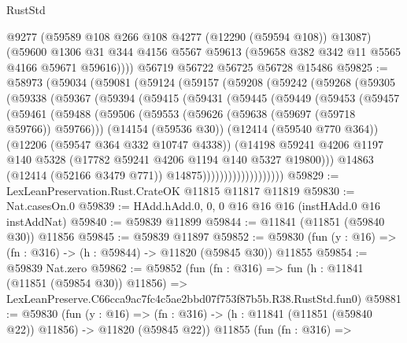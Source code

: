 \begin{lexlean}{RustStd}
\begin{coremodule}
        @9277
        (@59589 @108 @266 @108 @4277 (@12290 (@59594 @108)) @13087)
        (@59600
          @1306
          @31
          @344
          @4156
          @5567
          @59613
          (@59658 @382 @342 @11 @5565 @4166 @59671 @59616))))
    @56719
    @56722
    @56725
    @56728
    @15486
@59825 := @58973
    (@59034
      (@59081
        (@59124
          (@59157
            (@59208
              (@59242
                (@59268
                  (@59305
                    (@59338
                      (@59367
                        (@59394
                          (@59415
                            (@59431
                              (@59445
                                (@59449
                                  (@59453
                                    (@59457
                                      (@59461
                                        (@59488
                                          (@59506
                                            (@59553
                                              (@59626 (@59638 (@59697 (@59718 @59766)) @59766)))
                                            (@14154 (@59536 @30))
                                            (@12414 (@59540 @770 @364))
                                            (@12206 (@59547 @364 @332 @10747 @4338))
                                            (@14198
                                              @59241
                                              @4206
                                              @1197
                                              @140
                                              @5328
                                              (@17782 @59241 @4206 @1194 @140 @5327 @19800)))
                                          @14863
                                          (@12414 (@52166 @3479 @771))
                                          @14875)))))))))))))))))))
@59829 := LexLeanPreservation.Rust.CrateOK @11815 @11817 @11819
@59830 := Nat.casesOn.{0}
@59839 := HAdd.hAdd.{0, 0, 0} @16 @16 @16 (instHAdd.{0} @16 instAddNat)
@59840 := @59839 @11899
@59844 := @11841 (@11851 (@59840 @30)) @11856
@59845 := @59839 @11897
@59852 := @59830 (fun (y : @16) => (fn : @316) -> (h : @59844) -> @11820 (@59845 @30)) @11855
@59854 := @59839 Nat.zero
@59862 := @59852
    (fun (fn : @316) =>
    fun (h : @11841 (@11851 (@59854 @30)) @11856) =>
    LexLeanPreserve.C66cca9ac7fc4c5ae2bbd07f753f87b5b.R38.RustStd.fun0)
@59881 := @59830
    (fun (y : @16) =>
    (fn : @316) -> (h : @11841 (@11851 (@59840 @22)) @11856) -> @11820 (@59845 @22))
    @11855
    (fun (fn : @316) =>

\end{coremodule}
\end{lexlean}
